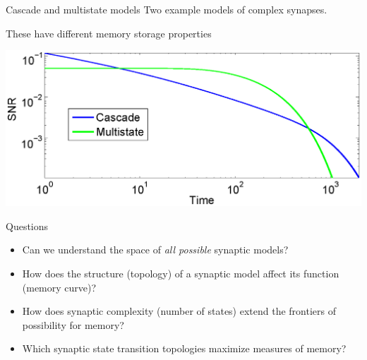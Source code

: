 \documentclass[final,hyperref={pdfpagelabels=false,bookmarks=false}]{beamer}
\begin{document}
\begin{frame}{}
\begin{columns}[t]
\begin{column}{0.27\linewidth}
\begin{block}{Cascade and multistate models}
%
 Two example models of complex synapses.
 \begin{center}
  \hspace{2cm}
 \end{center}

 These have different memory storage properties
 \begin{center}
 \includegraphics[width=15cm]{cascms.eps}
 \end{center}
%
\end{block}



\begin{block}{Questions}
%
 \begin{itemize}
   \item Can we understand the space of \emph{all possible} synaptic models?
   \item How does the structure (topology) of a synaptic model affect its function (memory curve)?
   \item How does synaptic complexity (number of states) extend the frontiers of possibility for memory?
   \item Which synaptic state transition topologies maximize measures of memory?
 \end{itemize}
%
\end{block}



\end{column}
\end{columns}
\end{frame}
\end{document}
